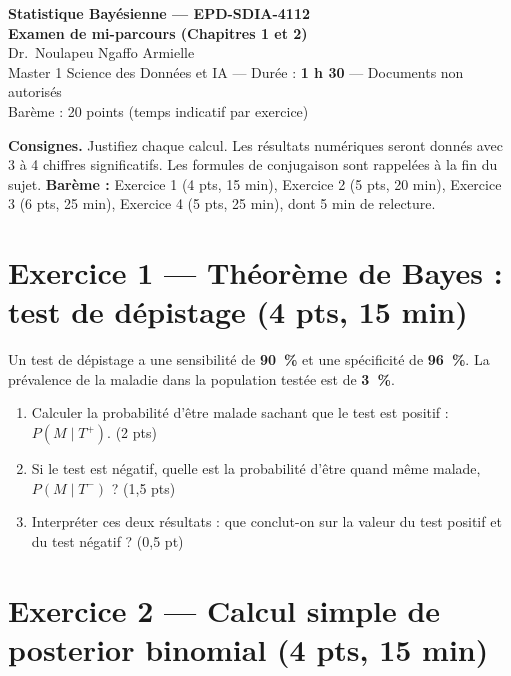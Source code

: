 \documentclass[11pt,a4paper]{article}
\begin{document}
\begin{center}
{\Large\bfseries Statistique Bayésienne --- EPD-SDIA-4112}\\[2mm]
{\LARGE\bfseries Examen de mi-parcours (Chapitres 1 et 2)}\\[2mm]
{\large Dr.\ Noulapeu Ngaffo Armielle}\\[2mm]
Master 1 Science des Données et IA \quad --- \quad Durée : \textbf{1 h 30} \quad --- \quad Documents non autorisés\\[1mm]
Barème : 20 points \quad (temps indicatif par exercice)
\end{center}

\vspace{2mm}
\begin{consignedur}
\small\textbf{Consignes.} Justifiez chaque calcul. Les résultats numériques seront donnés avec 3 à 4 chiffres significatifs. Les formules de conjugaison sont rappelées à la fin du sujet. \textbf{Barème :} Exercice 1 (4 pts, 15 min), Exercice 2 (5 pts, 20 min), Exercice 3 (6 pts, 25 min), Exercice 4 (5 pts, 25 min), dont 5 min de relecture.
\end{consignedur}

\section*{Exercice 1 --- Théorème de Bayes : test de dépistage (4 pts, 15 min)}

Un test de dépistage a une sensibilité de \textbf{90~\%} et une spécificité de \textbf{96~\%}. La prévalence de la maladie dans la population testée est de \textbf{3~\%}.

\begin{enumerate}[label=\alph*)]
  \item Calculer la probabilité d'être malade sachant que le test est positif : $P(M \mid T^+)$. \hfill (2 pts)
  \item Si le test est négatif, quelle est la probabilité d'être quand même malade, $P(M \mid T^-)$ ? \hfill (1,5 pts)
  \item Interpréter ces deux résultats : que conclut-on sur la valeur du test positif et du test négatif ? \hfill (0,5 pt)
\end{enumerate}

\section*{Exercice 2 --- Calcul simple de posterior binomial (4 pts, 15 min)}
\end{document}
